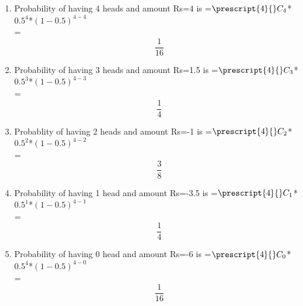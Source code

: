 \documentclass[journal,12pt,twocolumn]{IEEEtran}
\newcommand\Mycomb[2][^n]{\prescript{#1\mkern-0.5mu}{}C_{#2}}
\begin{document}
        \begin{enumerate}
	        \item Probability of having 4 heads and amount Rs=4 is 
			 =${\Mycomb[4]{4}}$*${0.5^4}$*${{(1-0.5)}^{4-4}}$\\
		        =\[\frac{1}{16}\] 
		\item Probability of having 3 heads and amount Rs=1.5 is
		        =${\Mycomb[4]{3}}$*${0.5^3}$*${{(1-0.5)}^{4-3}}$\\
		        =\[\frac{1}{4}\] 
		\item Probablity  of  having 2 heads and amount Rs=-1 is 
		        =${\Mycomb[4]{2}}$*${0.5^2}$*${{(1-0.5)}^{4-2}}$\\
		        =\[\frac{3}{8}\] 
		\item Probability  of  having 1 head and amount Rs=-3.5 is
		        =${\Mycomb[4]{1}}$*${0.5^1}$*${{(1-0.5)}^{4-1}}$\\
		        =\[\frac{1}{4}\] 
		\item Probability  of  having 0 head and amount Rs=-6 is 
		        =${\Mycomb[4]{0}}$*${0.5^4}$*${{(1-0.5)}^{4-0}}$\\
		        =\[\frac{1}{16}\] 
	\end{enumerate}
       
         
	
\end{document}
